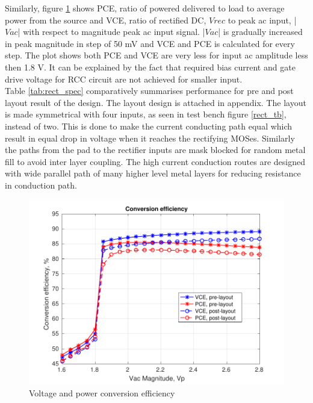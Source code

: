 \documentclass[12pt,a4paper,UKenglish]{report}
\begin{document}
Similarly, figure  \ref{rect_ce} shows PCE, ratio of powered delivered to load to average power from the source and 
VCE, ratio of rectified DC, $Vrec$ to peak ac input, |$Vac$| with respect to magnitude peak ac input signal. |$Vac$| is gradually increased in 
peak magnitude in step of 50 mV and VCE and PCE is calculated for every step. The plot shows both 
PCE and VCE are very less for input ac amplitude less then 1.8 V. It can be explained by the fact that required 
bias current and gate drive voltage for RCC circuit are not achieved for smaller input. \\

Table \ref{tab:rect_spec} comparatively summarises performance for pre and post layout result of the design. The layout design is attached in appendix. The layout 
is made symmetrical with four inputs, as seen in test bench figure \ref{rect_tb}, instead of two. This is done to make the current conducting path equal which result in 
equal drop in voltage when it reaches the rectifying MOSes. Similarly the paths from the pad to the rectifier inputs are mask blocked for random metal fill to avoid 
inter layer coupling. The high current conduction routes are designed with wide parallel path of many higher level metal layers for reducing resistance in conduction path.

\begin{figure}[!htbp] %
   \centering
   \includegraphics[width=\textwidth]{img/rectifier_ce.pdf} 
   \caption{Voltage and power conversion efficiency}
   \label{rect_ce}
\end{figure}
\end{document}
